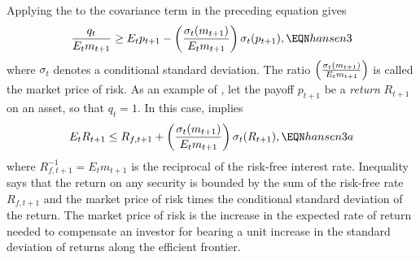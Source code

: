 Applying the 
 to the covariance term in the preceding equation
gives
$${q_t \over E_t m_{t+1} } \geq
    E_t p_{t+1} -
\left({\sigma_t (m_{t+1}) \over E_t m_{t+1} }\right)
 \sigma_t (p_{t+1}) ,
      \EQN hansen3  $$
where $\sigma_t$ denotes a conditional standard deviation.
The ratio $\left({\sigma_t (m_{t+1}) \over E_t m_{t+1} }\right)$ is called the
market price of risk.  %
As an example of , let the payoff $p_{t+1}$ be a {\it return} $R_{t+1}$ on an asset, so that
$q_t = 1$.  In this case,  implies
$$ E_t R_{t+1} \leq R_{f,t+1} + \left({\sigma_t (m_{t+1}) \over E_t m_{t+1} }\right) \sigma_t(R_{t+1}) ,   \EQN hansen3a $$
where $R_{f,t+1}^{-1} = E_t m_{t+1}$ is the reciprocal of the risk-free interest rate.
Inequality  says that  the return on any security is bounded by the sum of the risk-free rate $R_{f,t+1}$ and
the market price of risk times the conditional standard deviation of the return.
The market price of risk %
is the
increase in the expected rate of return needed to compensate an
investor for bearing a unit increase in the standard deviation of returns
along the efficient frontier.%


